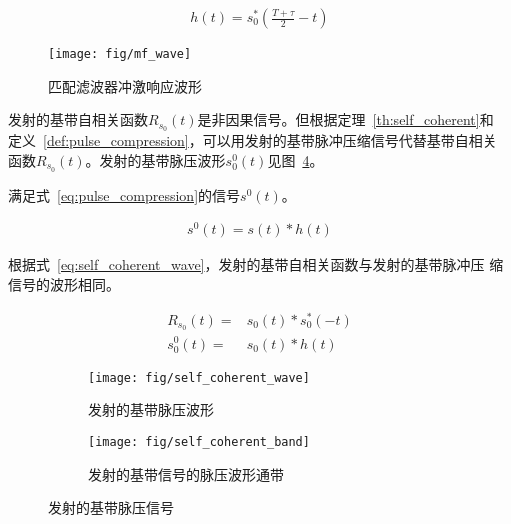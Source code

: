 \documentclass[../main]{subfiles}
\begin{document}
\begin{align}
  \label{eq:match_filter}
  h(t) = s_0^*(\frac{T + \tau}{2} - t)
\end{align}

\begin{figure}[htbp]
  \centering
  \texttt{[image: fig/mf\_wave]}
  \caption{匹配滤波器冲激响应波形}%
  \label{fig:mf_wave}
\end{figure}

发射的基带自相关函数$R_{s_0}(t)$是非因果信号。但根据定理~\ref{th:self_coherent}和
定义~\ref{def:pulse_compression}，可以用发射的基带脉冲压缩信号代替基带自相关
函数$R_{s_0}(t)$。发射的基带脉压波形$s_0^0(t)$见图~\ref{fig:self_coherent}。

\begin{definition}[脉冲压缩信号]%
  \label{def:pulse_compression}
  满足式~\ref{eq:pulse_compression}的信号$s^0(t)$。
\end{definition}

\begin{align}
  \label{eq:pulse_compression}
  s^0(t) = s(t) * h(t)
\end{align}

\begin{theorem}[发射的基带自相关函数与发射的基带脉冲压缩信号的关系]%
  \label{th:self_coherent}
  根据式~\ref{eq:self_coherent_wave}，发射的基带自相关函数与发射的基带脉冲压
  缩信号的波形相同。
\end{theorem}

\begin{align}
  \label{eq:self_coherent_wave}
  R_{s_0}(t) = & s_0(t) * s_0^*(-t)\\
  s_0^0(t) = & s_0(t) * h(t)
\end{align}

\begin{figure}[htbp]
  \centering
  \begin{subfigure}[htbp]{0.45\linewidth}
    \centering
    \texttt{[image: fig/self\_coherent\_wave]}
    \caption{发射的基带脉压波形}%
    \label{fig:self_coherent_wave}
  \end{subfigure}
  \quad
  \begin{subfigure}[htbp]{0.45\linewidth}
    \centering
    \texttt{[image: fig/self\_coherent\_band]}
    \caption{发射的基带信号的脉压波形通带}%
    \label{fig:self_coherent_band}
  \end{subfigure}
  \caption{发射的基带脉压信号}%
  \label{fig:self_coherent}
\end{figure}
\end{document}
